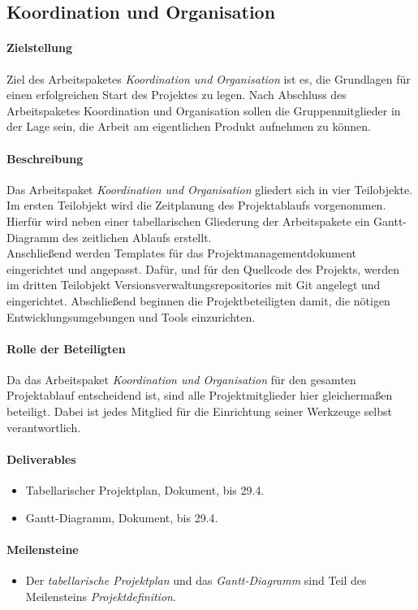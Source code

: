 \subsection{Koordination und Organisation}

\paragraph{Zielstellung}\noindent
Ziel des Arbeitspaketes \textit{Koordination und Organisation} ist es, die Grundlagen für einen erfolgreichen Start des Projektes zu legen. Nach Abschluss des Arbeitspaketes Koordination und Organisation sollen die Gruppenmitglieder in der Lage sein, die Arbeit am eigentlichen Produkt aufnehmen zu können.

\paragraph{Beschreibung}\noindent
Das Arbeitspaket \textit{Koordination und Organisation} gliedert sich in vier Teilobjekte. Im ersten Teilobjekt wird die Zeitplanung des Projektablaufs vorgenommen. Hierfür wird neben einer tabellarischen Gliederung der Arbeitspakete ein Gantt-Diagramm des zeitlichen Ablaufs erstellt.\\
Anschließend werden Templates für das Projektmanagementdokument eingerichtet und angepasst. Dafür, und für den Quellcode des Projekts, werden im dritten Teilobjekt Versionsverwaltungsrepositories mit Git angelegt und eingerichtet. Abschließend beginnen die Projektbeteiligten damit, die nötigen Entwicklungsumgebungen und Tools einzurichten.

\paragraph{Rolle der Beteiligten}\noindent
Da das Arbeitspaket \textit{Koordination und Organisation} für den gesamten Projektablauf entscheidend ist, sind alle Projektmitglieder hier gleichermaßen beteiligt. Dabei ist jedes Mitglied für die Einrichtung seiner Werkzeuge selbst verantwortlich.

\paragraph{Deliverables}\noindent
\begin{itemize}
\item Tabellarischer Projektplan, Dokument, bis 29.4.
\item Gantt-Diagramm, Dokument, bis 29.4.
\end{itemize}

\paragraph{Meilensteine}\noindent
\begin{itemize}
\item Der \textit{tabellarische Projektplan} und das \textit{Gantt-Diagramm} sind Teil des Meilensteins \textit{Projektdefinition}.
\end{itemize}

